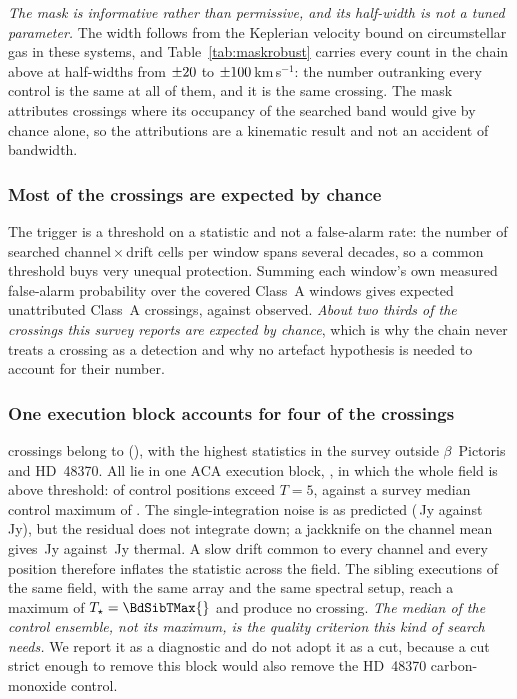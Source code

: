 \emph{The mask is informative rather than permissive, and its half-width is
not a tuned parameter.} The width follows from the Keplerian velocity bound
on circumstellar gas in these systems, and Table~\ref{tab:maskrobust}
carries every count in the chain above at half-widths from
$\pm20$ to $\pm100$\,km\,s$^{-1}$: the number outranking
every control is the same at all of them, and it is the same crossing. The
mask attributes \NAttributed{} crossings where its occupancy of the searched
band would give \LgExpAttr{} by chance alone, so the attributions are a
kinematic result and not an accident of bandwidth.

\subsubsection{Most of the crossings are expected by chance}
\label{sec:trigunif}

The trigger is a threshold on a statistic and not a false-alarm
rate: the number of searched channel\,$\times$\,drift cells per window spans
several decades, so a common threshold buys very unequal protection.
Summing each window's own measured false-alarm probability over the covered
Class~A windows gives \RsevChanceExp{} expected unattributed Class~A
crossings, against \RsevChanceObsAUnattr{} observed. \emph{About two thirds
of the crossings this survey reports are expected by chance}, which is why
the chain never treats a crossing as a detection and why no artefact
hypothesis is needed to account for their number.

\subsubsection{One execution block accounts for four of the crossings}
\label{sec:bdblock}

\BdNCross{} crossings belong to \BdStar{} (\BdAlias), with the highest
statistics in the survey outside $\beta$~Pictoris and HD~48370. All
\BdNCrossBlock{} lie in one ACA execution block, \texttt{\BdBlock}, in which
the whole field is above threshold: \BdNCtrlAbove{} of \BdNCtrl{} control
positions exceed $T=5$, against a survey median control maximum of
\BdSurvCtrlMed. The single-integration noise is as predicted
(\BdRmsMeas\,Jy against \BdRmsPred\,Jy), but the residual does not integrate
down; a jackknife on the channel mean gives \BdJack\,Jy against
\BdThermal\,Jy thermal. A slow drift common to every channel and every
position therefore inflates the statistic across the field. The
\BdNSibling{} sibling executions of the same field, with the same array and
the same spectral setup, reach a maximum of $T_\star=\BdSibTMax{}$ and
produce no crossing. \emph{The median of the control ensemble, not its
maximum, is the quality criterion this kind of search needs.} We report it
as a diagnostic and do not adopt it as a cut, because a cut strict enough to
remove this block would also remove the HD~48370 carbon-monoxide control.

